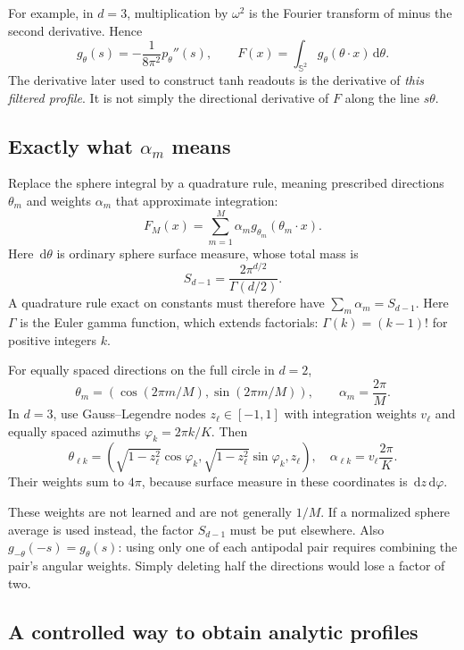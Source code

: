 \documentclass[11pt]{article}
\newcommand{\dd}{\,\mathrm d}
\begin{document}
For example, in $d=3$, multiplication by $\omega^2$ is the Fourier transform of minus the second derivative. Hence
\begin{equation}
 g_\theta(s)=-\frac1{8\pi^2}p_\theta''(s),\qquad
 F(x)=\int_{\mathbb S^2}g_\theta(\theta\cdot x)\dd\theta.
 \label{eq:3d-profile}
\end{equation}
The derivative later used to construct tanh readouts is the derivative of \emph{this filtered profile}. It is not simply the directional derivative of $F$ along the line $s\theta$.

\subsection{Exactly what \texorpdfstring{$\alpha_m$}{alpha-m} means}

Replace the sphere integral by a quadrature rule, meaning prescribed directions $\theta_m$ and weights $\alpha_m$ that approximate integration:
\begin{equation}
 F_M(x)=\sum_{m=1}^M\alpha_m g_{\theta_m}(\theta_m\cdot x).
 \label{eq:angular-sum}
\end{equation}
Here $\dd\theta$ is ordinary sphere surface measure, whose total mass is
\[
 S_{d-1}=\frac{2\pi^{d/2}}{\Gamma(d/2)}.
\]
A quadrature rule exact on constants must therefore have $\sum_m\alpha_m=S_{d-1}$.
Here $\Gamma$ is the Euler gamma function, which extends factorials: $\Gamma(k)=(k-1)!$ for positive integers $k$.

For equally spaced directions on the full circle in $d=2$,
\[
 \theta_m=(\cos(2\pi m/M),\sin(2\pi m/M)),\qquad \alpha_m=\frac{2\pi}{M}.
\]
In $d=3$, use Gauss--Legendre nodes $z_\ell\in[-1,1]$ with integration weights $v_\ell$ and equally spaced azimuths $\varphi_k=2\pi k/K$. Then
\[
 \theta_{\ell k}=(\sqrt{1-z_\ell^2}\cos\varphi_k,
 \sqrt{1-z_\ell^2}\sin\varphi_k,z_\ell),\quad
 \alpha_{\ell k}=v_\ell\frac{2\pi}{K}.
\]
Their weights sum to $4\pi$, because surface measure in these coordinates is $\dd z\dd\varphi$.

These weights are not learned and are not generally $1/M$. If a normalized sphere average is used instead, the factor $S_{d-1}$ must be put elsewhere. Also $g_{-\theta}(-s)=g_\theta(s)$: using only one of each antipodal pair requires combining the pair's angular weights. Simply deleting half the directions would lose a factor of two.

\subsection{A controlled way to obtain analytic profiles}
\end{document}
